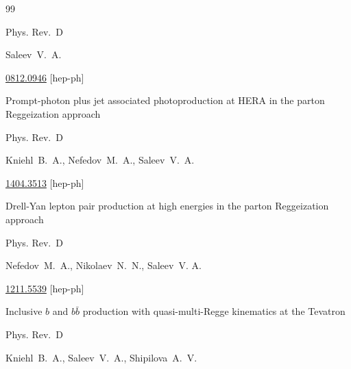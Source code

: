 \begin{thebibliography}{99}

\jour Phys. Rev.~D 



\by Saleev~V.~A.



\arxiv \href{http://arxiv.org/abs/0812.0946}{0812.0946} [hep-ph]




\paper Prompt-photon plus jet associated photoproduction at HERA in the parton Reggeization approach


\jour Phys. Rev.~D 



\by Kniehl~B.~A.,  Nefedov~M.~A., Saleev~V.~A.



\arxiv \href{http://arxiv.org/abs/1404.3513}{1404.3513} [hep-ph]




\paper Drell-Yan lepton pair production at high energies in the parton Reggeization approach


\jour Phys. Rev.~D 



\by  Nefedov~M.~A.,  Nikolaev~N.~N., Saleev~V. A.



\arxiv \href{http://arxiv.org/abs/1211.5539}{1211.5539} [hep-ph]






\paper Inclusive $b$ and $b \bar b$  production with quasi-multi-Regge kinematics at the Tevatron


\jour Phys. Rev.~D 



\by Kniehl~B.~A., Saleev~V.~A.,  Shipilova~A.~V.


\end{thebibliography}
